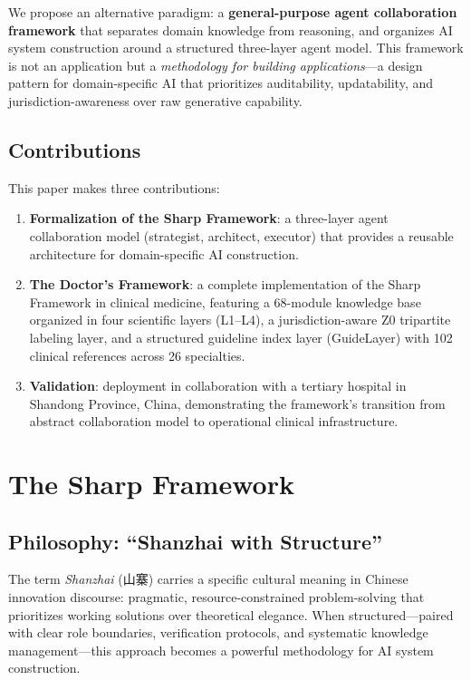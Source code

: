 \documentclass[11pt]{article}
\begin{document}
We propose an alternative paradigm: a \textbf{general-purpose agent 
collaboration framework} that separates domain knowledge from reasoning, 
and organizes AI system construction around a structured three-layer 
agent model. This framework is not an application but a \textit{methodology 
for building applications}---a design pattern for domain-specific AI that 
prioritizes auditability, updatability, and jurisdiction-awareness over 
raw generative capability.

\subsection{Contributions}

This paper makes three contributions:

\begin{enumerate}[leftmargin=*]
    \item \textbf{Formalization of the Sharp Framework}: a three-layer agent 
    collaboration model (strategist, architect, executor) that provides a 
    reusable architecture for domain-specific AI construction.
    \item \textbf{The Doctor's Framework}: a complete implementation of the 
    Sharp Framework in clinical medicine, featuring a 68-module knowledge 
    base organized in four scientific layers (L1--L4), a jurisdiction-aware 
    Z0 tripartite labeling layer, and a structured guideline index layer 
    (GuideLayer) with 102 clinical references across 26 specialties.
    \item \textbf{Validation}: deployment in collaboration with a tertiary 
    hospital in Shandong Province, China, demonstrating the framework's 
    transition from abstract collaboration model to operational clinical 
    infrastructure.
\end{enumerate}

\section{The Sharp Framework}

\subsection{Philosophy: ``Shanzhai with Structure''}

The term \textit{Shanzhai} (山寨) carries a specific cultural meaning in 
Chinese innovation discourse: pragmatic, resource-constrained problem-solving 
that prioritizes working solutions over theoretical elegance. When 
structured---paired with clear role boundaries, verification protocols, 
and systematic knowledge management---this approach becomes a powerful 
methodology for AI system construction.
\end{document}
